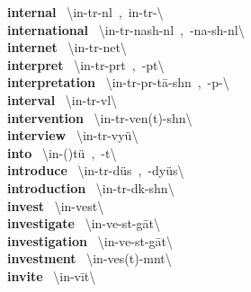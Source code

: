 \documentclass[10pt,a4paper]{article}
\begin{document}
\begin{multicols}{2}
\textbf{ internal }\quad \ \textbackslash in-\textprimstress t\textschwa r-n\textsuperscript{\textreve}l\ ,\ \textprimstress in-\textsecstress t\textschwa r-\textbackslash \\
\textbf{ international }\quad \ \textbackslash \textsecstress in-t\textschwa r-\textprimstress nash-n\textschwa l\ ,\ -\textprimstress na-sh\textschwa -n\textsuperscript{\textreve}l\textbackslash \\
\textbf{ internet }\quad \ \textbackslash \textprimstress in-t\textschwa r-\textsecstress net\textbackslash \\
\textbf{ interpret }\quad \ \textbackslash in-\textprimstress t\textschwa r-pr\textschwa t\ ,\ -p\textschwa t\textbackslash \\
\textbf{ interpretation }\quad \ \textbackslash in-\textsecstress t\textschwa r-pr\textschwa -\textprimstress t\={a}-sh\textschwa n\ ,\ -p\textschwa -\textbackslash \\
\textbf{ interval }\quad \ \textbackslash \textprimstress in-t\textschwa r-v\textschwa l\textbackslash \\
\textbf{ intervention }\quad \ \textbackslash \textsecstress in-t\textschwa r-\textprimstress ven(t)-sh\textschwa n\textbackslash \\
\textbf{ interview }\quad \ \textbackslash \textprimstress in-t\textschwa r-\textsecstress vy\"{u}\textbackslash \\
\textbf{ into }\quad \ \textbackslash \textprimstress in-(\textsecstress )t\"{u}\ ,\ -t\textschwa \textbackslash \\
\textbf{ introduce }\quad \ \textbackslash \textsecstress in-tr\textschwa -\textprimstress d\"{u}s\ ,\ -\textprimstress dy\"{u}s\textbackslash \\
\textbf{ introduction }\quad \ \textbackslash \textsecstress in-tr\textschwa -\textprimstress d\textschwa k-sh\textschwa n\textbackslash \\
\textbf{ invest }\quad \ \textbackslash in-\textprimstress vest\textbackslash \\
\textbf{ investigate }\quad \ \textbackslash in-\textprimstress ve-st\textschwa -\textsecstress g\={a}t\textbackslash \\
\textbf{ investigation }\quad \ \textbackslash in-\textprimstress ve-st\textschwa -\textsecstress g\={a}t\textbackslash \\
\textbf{ investment }\quad \ \textbackslash in-\textprimstress ves(t)-m\textschwa nt\textbackslash \\
\textbf{ invite }\quad \ \textbackslash in-\textprimstress v\={i}t\textbackslash \\

\end{multicols}
\end{document}
